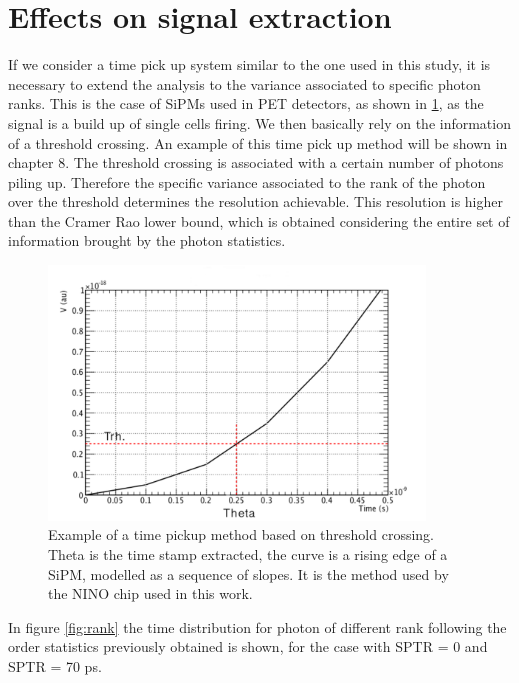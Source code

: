 \section{Effects on signal extraction}

If we consider a time pick up system similar to the one used in this study, it is necessary to extend the analysis to the variance associated to specific photon ranks. 
This is the case of SiPMs used in PET detectors, as shown in \ref{fig:crossing}, as the signal is a build up of single cells firing. We then basically rely on the information of a threshold crossing. An example of this time pick up method will be shown in chapter 8.
The threshold crossing is associated with a certain number of photons piling up. Therefore the specific variance associated to the rank of the photon over the threshold determines the resolution achievable. This resolution is higher than the Cramer Rao lower bound, which is obtained considering the entire set of information brought by the photon statistics.
\begin{figure}[htbp]
\begin{center}
\includegraphics[width=10cm]{../Pictures/Chapter_4/crossing.pdf}
\end{center}
\caption[Threshold crossing example]{Example of a time pickup method based on threshold crossing. Theta is the time stamp extracted, the curve is a rising edge of a SiPM, modelled as a sequence of slopes. It is the method used by the NINO chip used in this work.}
\label{fig:crossing}
\end{figure}
In figure \ref{fig:rank} the time distribution for photon of different rank following the order statistics previously obtained is shown, for the case with SPTR = 0 and SPTR = 70 ps.

